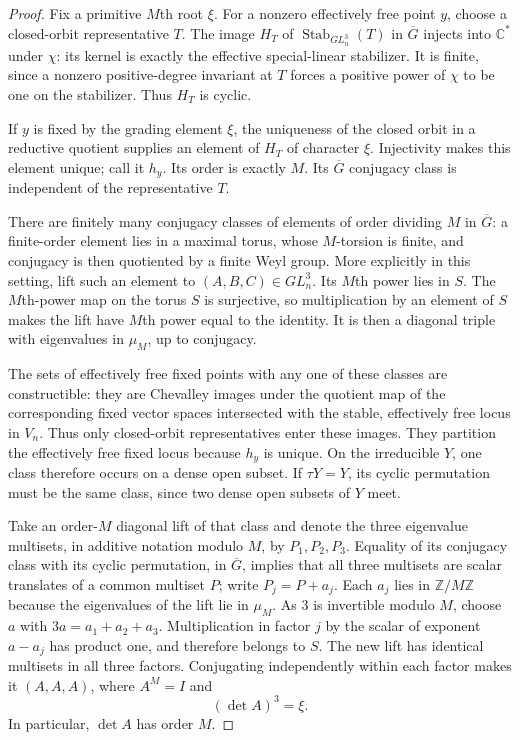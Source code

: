 \begin{proof}
Fix a primitive $M$th root $\xi$.  For a nonzero effectively free
point $y$, choose a closed-orbit representative $T$.  The image
$H_T$ of $\operatorname{Stab}_{GL_n^3}(T)$ in $\overline G$
injects into $\mathbb C^*$ under $\chi$: its kernel is exactly
the effective special-linear stabilizer.  It is finite, since a
nonzero positive-degree invariant at $T$ forces a positive power
of $\chi$ to be one on the stabilizer.  Thus $H_T$ is cyclic.

If $y$ is fixed by the grading element $\xi$, the uniqueness of
the closed orbit in a reductive quotient supplies an element
of $H_T$ of character $\xi$.  Injectivity makes this element
unique; call it $h_y$.  Its order is exactly $M$.  Its
$\overline G$ conjugacy class is independent of the representative
$T$.

There are finitely many conjugacy classes of elements of order
dividing $M$ in $\overline G$: a finite-order element lies in a
maximal torus, whose $M$-torsion is finite, and conjugacy is then
quotiented by a finite Weyl group.  More explicitly in this
setting, lift such an element to $(A,B,C)\in GL_n^3$.  Its
$M$th power lies in $S$.  The $M$th-power map on the torus $S$
is surjective, so multiplication by an element of $S$ makes the
lift have $M$th power equal to the identity.  It is then a
diagonal triple with eigenvalues in $\mu_M$, up to conjugacy.

The sets of effectively free fixed points with any one of these
classes are constructible: they are Chevalley images under the
quotient map of the corresponding fixed vector spaces intersected
with the stable, effectively free locus in $V_n$.  Thus only
closed-orbit representatives enter these images.  They partition
the effectively free fixed locus because
$h_y$ is unique.  On the irreducible $Y$, one class therefore
occurs on a dense open subset.  If $\tau Y=Y$, its cyclic
permutation must be the same class, since two dense open subsets
of $Y$ meet.

Take an order-$M$ diagonal lift of that class and denote the
three eigenvalue multisets, in additive notation modulo $M$,
by $P_1,P_2,P_3$.  Equality of its conjugacy class with its cyclic
permutation, in $\overline G$, implies that all three multisets
are scalar translates of a common multiset $P$; write
$P_j=P+a_j$.  Each $a_j$ lies in $\mathbb Z/M\mathbb Z$ because
the eigenvalues of the lift lie in $\mu_M$.  As $3$ is invertible
modulo $M$, choose $a$ with $3a=a_1+a_2+a_3$.  Multiplication in
factor $j$ by the scalar of exponent $a-a_j$ has product one,
and therefore belongs to $S$.  The new lift has identical
multisets in all three factors.  Conjugating independently
within each factor makes it $(A,A,A)$, where $A^M=I$ and
\[
                         (\det A)^3=\xi.
\]
In particular, $\det A$ has order $M$.


\end{proof}
